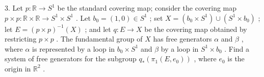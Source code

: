 \documentclass[10pt]{article}
\begin{document}
3. Let \(p : \mathbb{R} \rightarrow  {S}^{1}\) be the standard covering map; consider the covering map \(p \times  p : \mathbb{R} \times  \mathbb{R} \rightarrow  {S}^{1} \times  {S}^{1}\) . Let \({b}_{0} = \left( {1,0}\right)  \in  {S}^{1}\) ; set \(X = \left( {{b}_{0} \times  {S}^{1}}\right)  \cup  \left( {{S}^{1} \times  {b}_{0}}\right)\) ; let \(E = {\left( p \times  p\right) }^{-1}\left( X\right)\) ; and let \(q : E \rightarrow  X\) be the covering map obtained by restricting \(p \times  p\) . The fundamental group of \(X\) has free generators \(\alpha\) and \(\beta\) , where \(\alpha\) is represented by a loop in \({b}_{0} \times  {S}^{1}\) and \(\beta\) by a loop in \({S}^{1} \times  {b}_{0}\) . Find a system of free generators for the subgroup \({q}_{ * }\left( {{\pi }_{1}\left( {E,{e}_{0}}\right) }\right)\) , where \({e}_{0}\) is the origin in \({\mathbb{R}}^{2}\) .
\end{document}
